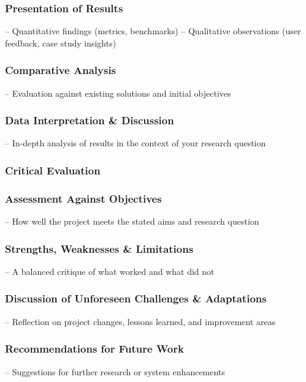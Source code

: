 \subsubsection{Presentation of Results}
– Quantitative findings (metrics, benchmarks)
– Qualitative observations (user feedback, case study insights)
\subsubsection{Comparative Analysis}
– Evaluation against existing solutions and initial objectives
\subsubsection{Data Interpretation \& Discussion}
– In-depth analysis of results in the context of your research question
\subsubsection{Critical Evaluation}
\subsubsection{Assessment Against Objectives}
– How well the project meets the stated aims and research question
\subsubsection{Strengths, Weaknesses \& Limitations}
– A balanced critique of what worked and what did not
\subsubsection{Discussion of Unforeseen Challenges \& Adaptations}
– Reflection on project changes, lessons learned, and improvement areas
\subsubsection{Recommendations for Future Work}
– Suggestions for further research or system enhancements